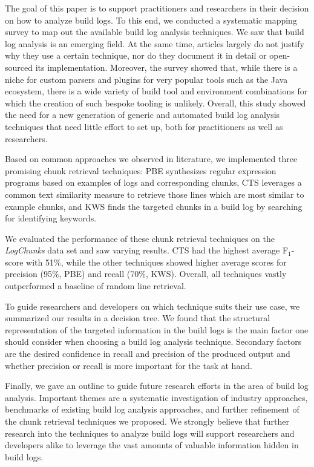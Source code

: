 \documentclass[10pt,journal,compsoc]{IEEEtran}
\begin{document}
The goal of this paper is to support practitioners and researchers in
their decision on how to analyze build logs.
To this end, we
conducted a systematic mapping survey to map out the available build
log analysis techniques.
We saw that build log analysis is an
emerging field.
At the same time, articles largely do not justify why
they use a certain technique, nor do they document it in detail or
open-sourced its implementation.
Moreover, the survey showed that,
while there is a niche for custom parsers and plugins for very popular
tools such as the Java ecosystem, there is a wide variety of build
tool and environment combinations for which the creation of such
bespoke tooling is unlikely.
Overall, this study showed the need for a new
generation of generic and automated build log analysis techniques that
need little effort to set up, both for practitioners as well as
researchers.

Based on common approaches we observed in literature,
we implemented three promising chunk retrieval techniques:
PBE synthesizes regular expression programs based on examples of logs
and corresponding chunks, CTS leverages a common text similarity
measure to retrieve those lines which are most similar to example
chunks, and KWS finds the targeted chunks in a build log by searching
for identifying keywords.

We evaluated the performance of these chunk retrieval techniques on the
\emph{LogChunks} data set and saw varying results.
CTS had the highest average F$_{1}$-score with 51\%, while the other
techniques showed higher average scores for precision (95\%, PBE) and
recall (70\%, KWS).
Overall, all techniques vastly outperformed a
baseline of random line retrieval.

To guide researchers and developers on which technique suits their
use case,
we summarized our results in a decision tree.
We found
that the structural representation of the targeted information in the
build logs is the main factor one should consider when
choosing a build log analysis
technique.
Secondary factors are the desired confidence in recall and
precision of the produced output and whether precision or recall is
more important for the task at hand.

Finally, we gave an
outline to guide future research efforts in the area of build log
analysis.
Important themes are a systematic investigation of industry approaches,
benchmarks of existing build log analysis approaches, and further
refinement of the chunk retrieval techniques we proposed.
We strongly believe that further research into the techniques to
analyze build logs will support researchers and developers alike to
leverage the vast amounts of valuable information hidden
in build logs.
\end{document}
